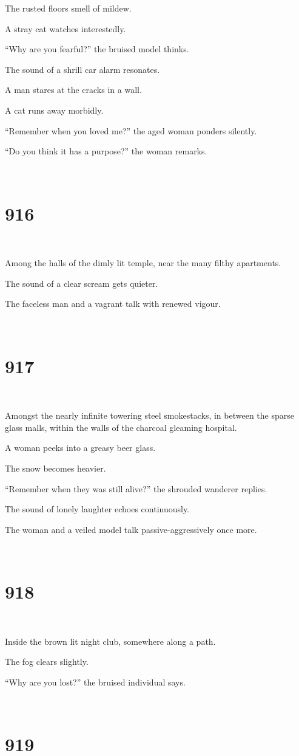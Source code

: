 \documentclass{report}
\begin{document}
The rusted floors smell of mildew.

A stray cat watches interestedly.

``Why are you fearful?'' the bruised model thinks.

The sound of a shrill car alarm resonates.

A man stares at the cracks in a wall.

A cat runs away morbidly.

``Remember when you loved me?'' the aged woman ponders silently.

``Do you think it has a purpose?'' the woman remarks.

~
\chapter*{916}
~

Among the halls of the dimly lit temple, near the many filthy apartments.

The sound of a clear scream gets quieter.

The faceless man and a vagrant talk with renewed vigour.

~
\chapter*{917}
~

Amongst the nearly infinite towering steel smokestacks, in between the sparse glass malls, within the walls of the charcoal gleaming hospital.

A woman peeks into a greasy beer glass.

The snow becomes heavier.

``Remember when they was still alive?'' the shrouded wanderer replies.

The sound of lonely laughter echoes continuously.

The woman and a veiled model talk passive-aggressively once more.

~
\chapter*{918}
~

Inside the brown lit night club, somewhere along a path.

The fog clears slightly.

``Why are you lost?'' the bruised individual says.

~
\chapter*{919}
~
\end{document}
